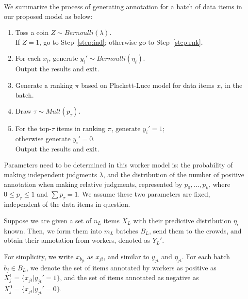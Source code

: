 We summarize the process of generating annotation for a batch of data items in our proposed model as below:
\begin{enumerate}
  \item \label{step:tosscoin}
        Toss a coin $Z \sim Bernoulli(\lambda)$.  \\
        If $Z=1$, go to Step~\ref{step:ind};
        otherwise go to Step~\ref{step:rnk}.
  \item \label{step:ind}
        For each $x_i$, generate $y_i' \sim Bernoulli(\eta_i)$. \\
        Output the results and exit.
  \item \label{step:rnk}
        Generate a ranking $\pi$ based on Plackett-Luce model for data items $x_i$ in the batch.
  \item \label{step:draw}
        Draw $\tau \sim Mult(p_{\tau})$.
  \item \label{step:annotate}
        For the top-$\tau$ items in ranking $\pi$, generate $y_i' = 1$; \\
        otherwise generate $y_i' = 0$.  \\
        Output the results and exit.
\end{enumerate}



Parameters need to be determined in this worker model is:
the probability of making independent judgments $\lambda$,
and the distribution of the number of positive annotation when making relative judgments,
represented by $p_0, \ldots, p_k$, where $0 \leq p_{\tau} \leq 1$ and $\sum p_{\tau} = 1$.
We assume these two parameters are fixed,
independent of the data items in question.

Suppose we are given a set of $n_L$ items $X_L$ with their predictive distribution $\eta_i$ known. %
Then, we form them into $m_L$ batches $B_L$, send them to the crowds,
and obtain their annotation from workers, denoted as $Y_L'$.


For simplicity, we write $x_{b_{jt}}$ as $x_{jt}$, and similar to $y_{jt}$ and $\eta_{jt}$.
For each batch $b_j \in B_L$, we denote the set of items annotated by workers as positive as $X_{j}^1 = \{x_{jt} | y_{jt}' = 1\}$,
and the set of items annotated as negative as $X_{j}^0 = \{x_{jt} | y_{jt}' = 0\}$.



